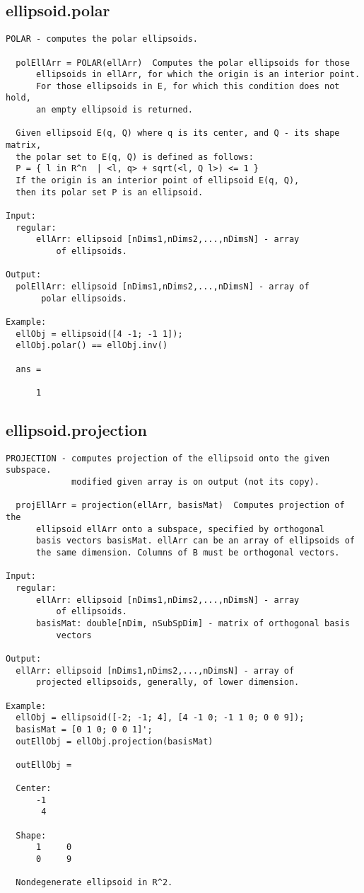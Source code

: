 \subsection{\texorpdfstring{ellipsoid.polar}{polar}}\label{method:ellipsoid.polar}
\begin{verbatim}
POLAR - computes the polar ellipsoids.

  polEllArr = POLAR(ellArr)  Computes the polar ellipsoids for those
      ellipsoids in ellArr, for which the origin is an interior point.
      For those ellipsoids in E, for which this condition does not hold,
      an empty ellipsoid is returned.

  Given ellipsoid E(q, Q) where q is its center, and Q - its shape matrix,
  the polar set to E(q, Q) is defined as follows:
  P = { l in R^n  | <l, q> + sqrt(<l, Q l>) <= 1 }
  If the origin is an interior point of ellipsoid E(q, Q),
  then its polar set P is an ellipsoid.

Input:
  regular:
      ellArr: ellipsoid [nDims1,nDims2,...,nDimsN] - array
          of ellipsoids.

Output:
  polEllArr: ellipsoid [nDims1,nDims2,...,nDimsN] - array of
       polar ellipsoids.

Example:
  ellObj = ellipsoid([4 -1; -1 1]);
  ellObj.polar() == ellObj.inv()

  ans =

      1
\end{verbatim}
\subsection{\texorpdfstring{ellipsoid.projection}{projection}}\label{method:ellipsoid.projection}
\begin{verbatim}
PROJECTION - computes projection of the ellipsoid onto the given subspace.
             modified given array is on output (not its copy).

  projEllArr = projection(ellArr, basisMat)  Computes projection of the
      ellipsoid ellArr onto a subspace, specified by orthogonal
      basis vectors basisMat. ellArr can be an array of ellipsoids of
      the same dimension. Columns of B must be orthogonal vectors.

Input:
  regular:
      ellArr: ellipsoid [nDims1,nDims2,...,nDimsN] - array
          of ellipsoids.
      basisMat: double[nDim, nSubSpDim] - matrix of orthogonal basis
          vectors

Output:
  ellArr: ellipsoid [nDims1,nDims2,...,nDimsN] - array of
      projected ellipsoids, generally, of lower dimension.

Example:
  ellObj = ellipsoid([-2; -1; 4], [4 -1 0; -1 1 0; 0 0 9]);
  basisMat = [0 1 0; 0 0 1]';
  outEllObj = ellObj.projection(basisMat)

  outEllObj =

  Center:
      -1
       4

  Shape:
      1     0
      0     9

  Nondegenerate ellipsoid in R^2.
\end{verbatim}
